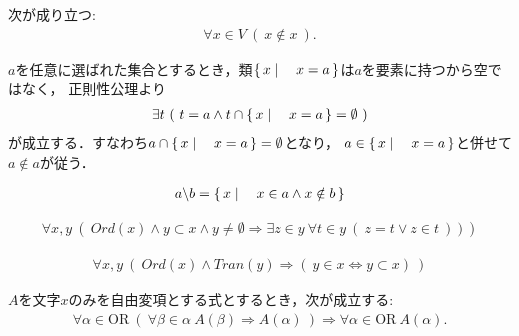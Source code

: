 	\begin{screen}
		\begin{thm}[いかなる集合も自分自身を要素に持たない]
			次が成り立つ:
			\begin{align}
				\forall x \in V\ (\ x \notin x\ ).
			\end{align}
		\end{thm}
	\end{screen}
	
	\begin{prf}
		$a$を任意に選ばれた集合とするとき，類$\left\{\, x \mid \quad x=a\, \right\}$は$a$を要素に持つから空ではなく，
		正則性公理より
		\begin{align}
			\exists t\ (\ t = a \wedge t \cap \Set{x}{x=a} = \emptyset\ )
		\end{align}
		が成立する．すなわち$a \cap \left\{\, x \mid \quad x=a\, \right\} = \emptyset$となり，
		$a \in \left\{\, x \mid \quad x=a\, \right\}$と併せて$a \notin a$が従う．
		\QED
	\end{prf}
	\begin{screen}
		\begin{dfn}[差集合]
			\begin{align}
				a \backslash b = \left\{\, x \mid \quad x \in a \wedge x \notin b\, \right\}
			\end{align}
		\end{dfn}
	\end{screen}
	
	\begin{screen}
		\begin{thm}[順序数は整列集合]
			\begin{align}
				\forall x,y\ \left(\ Ord(x) \wedge y \subset x \wedge y \neq \emptyset \Longrightarrow 
				\exists z \in y\ \forall t \in y\ (\ z=t \vee z \in t\ )\ )\ \right)
			\end{align}
		\end{thm}
	\end{screen}
	
	\begin{screen}
		\begin{thm}
			\begin{align}
				\forall x,y\ \left(\ Ord(x) \wedge Tran(y) \Longrightarrow 
				(\ y \in x \Longleftrightarrow y \subset x)\ \right)
			\end{align}
		\end{thm}
	\end{screen}
	
	\begin{screen}
		\begin{thm}[超限帰納法]
			$A$を文字$x$のみを自由変項とする式とするとき，次が成立する:
			\begin{align}
				\forall \alpha \in \mathrm{OR}\ 
				\left(\ \forall \beta \in \alpha\ A(\beta)
				\Longrightarrow A(\alpha)\ \right)
				\Longrightarrow \forall \alpha \in \mathrm{OR}\ A(\alpha).
			\end{align}
		\end{thm}
	\end{screen}
	
